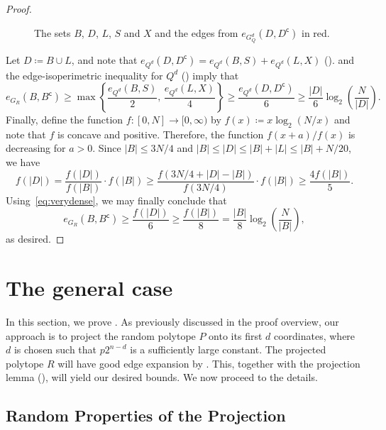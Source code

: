 \documentclass[11pt,a4paper,oneside,reqno]{amsart}
\begin{document}
\begin{proof}
\begin{figure}[h]
{\hfil}
    \caption{The sets $B$, $D$, $L$, $S$ and $X$ and the edges from $e_{G_Q^d}(D, D^{\mathsf{c}})$ in red.}
    \label{fig:fig4}
  \end{figure}
  Let $D \coloneqq B \cup L$, and note that $e_{Q^d}(D,D^{\mathsf{c}})=e_{Q^d}(B,S)+e_{Q^d}(L,X)$ ().   and the edge-isoperimetric inequality for $Q^d$ () imply that
  \begin{equation}\label{eq:verydense}
    e_{G_R}(B,B^{\mathsf{c}})\geq \max\left\{\frac{e_{Q^d}(B,S)}{2},\, \frac{e_{Q^d}(L,X)}{4}\right\} \ge \frac{e_{Q^d}(D, D^{\mathsf{c}})}{6} \geq \frac{|D|}{6}\log_2\left(\frac{N}{|D|}\right).
  \end{equation}
  Finally, define the function $f \colon [0,N] \to [0,\infty)$ by $f(x) \coloneqq x \log_2(N/x)$ and note that $f$ is concave and positive. Therefore, the function $f(x+a)/f(x)$ is decreasing for $a>0$. Since $|B| \le 3N/4$ and $|B| \le |D| \le |B| + |L| \le |B| + N/20$, we have
  \[
    f(|D|) = \frac{f(|D|)}{f(|B|)} \cdot f(|B|) \ge \frac{f(3N/4+|D|-|B|)}{f(3N/4)} \cdot f(|B|) \ge \frac{4f(|B|)}{5}.
  \]
  Using~\eqref{eq:verydense}, we may finally conclude that
  \[
    e_{G_R}(B, B^{\mathsf{c}}) \ge \frac{f(|D|)}{6} \ge \frac{f(|B|)}{8} = \frac{|B|}{8}\log_2\left(\frac{N}{|B|}\right),
  \]
  as desired.
\end{proof}

\newpage

\section{The general case}\label{sec:general}

In this section, we prove . As previously discussed in the proof overview, our approach is to project the random polytope $P$ onto its first $d$ coordinates, where $d$ is chosen such that $p2^{n-d}$ is a sufficiently large constant. The projected polytope $R$ will have good edge expansion by . This, together with the projection lemma (), will yield our desired bounds. We now proceed to the details.

\subsection{Random Properties of the Projection}\label{subsec:randprojection}
\end{document}

